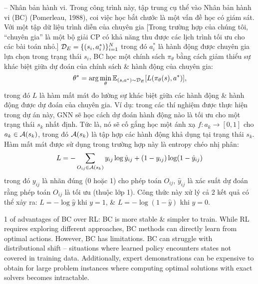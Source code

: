 \documentclass{article}
\begin{document}
\begin{itemize}
\begin{itemize}
\begin{itemize}
            -- {\sf Nhân bản hành vi.} Trong công trình này, tập trung cụ thể vào Nhân bản hành vi (BC) (Pomerleau, 1988), coi việc học bắt chước là một vấn đề học có giám sát. Với một tập dữ liệu trình diễn của chuyên gia [Trong trường hợp của chúng tôi, ``chuyên gia'' là một bộ giải CP có khả năng thu được các lịch trình tối ưu cho các bài toán nhỏ.] ${\cal D}_E = \{(s_i,a_i^*)\}_{i=1}^N$ trong đó $a_i^*$ là hành động được chuyên gia lựa chọn trong trạng thái $s_i$, BC học một chính sách $\pi_\theta$ bằng cách giảm thiểu sự khác biệt giữa dự đoán của chính sách \& hành động của chuyên gia:
            \begin{equation*}
                \theta^* = \arg\min_\theta \mathbb{E}_{(s,a^*)\sim{\cal D}_E}[L(\pi_\theta(s),a^*)],
            \end{equation*}
            trong đó $L$ là hàm mất mát đo lường sự khác biệt giữa các hành động \& hành động được dự đoán của chuyên gia. Ví dụ: trong các thí nghiệm được thực hiện trong dự án này, GNN sẽ học cách dự đoán hành động nào là tối ưu cho một trạng thái $s_k$ nhất định. Tức là, nó sẽ cố gắng học một ánh xạ $f:a_k\to[0,1]$ cho $a_k\in{\cal A}(s_k)$, trong đó ${\cal A}(s_k)$ là tập hợp các hành động khả dụng tại trạng thái $s_k$. Hàm mất mát được sử dụng trong trường hợp này là entropy chéo nhị phân:
            \begin{equation*}
                L = -\sum_{O_{ij}\in{\cal A}(s_k)} y_{ij}\log\hat{y}_{ij} + (1 - y_{ij})\log(1 - \hat{y}_{ij})
            \end{equation*}
            trong đó $y_{ij}$ là nhãn đúng (0 hoặc 1) cho phép toán $O_{ij}$, $\hat{y}_{ij}$ là xác suất dự đoán rằng phép toán $O_{ij}$ là tối ưu (thuộc lớp 1). Công thức này xử lý cả 2 kết quả có thể xảy ra: $L = -\log\hat{y}$ khi $y = 1$, \& $L = -\log(1 - \hat{y})$ khi $y = 0$.

            1 of advantages of BC over RL: BC is more stable \& simpler to train. While RL requires exploring different approaches, BC methods can directly learn from optimal actions. However, BC has limitations. BC can struggle with distributional shift -- situations where learned policy encounters states not covered in training data. Additionally, expert demonstrations can be expensive to obtain for large problem instances where computing optimal solutions with exact solvers becomes intractable.


\end{itemize}
\end{itemize}
\end{itemize}
\end{document}
